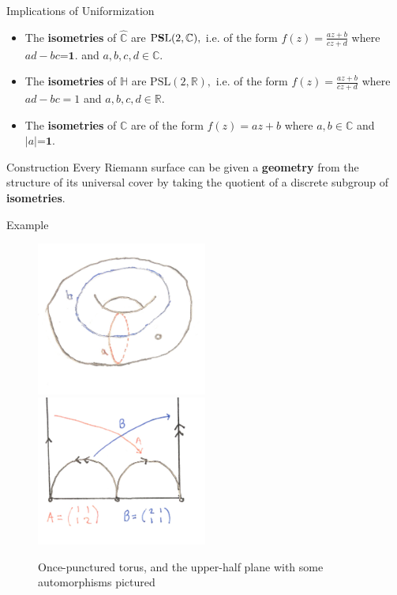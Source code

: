 \documentclass{beamer}
\begin{document}
\begin{frame}{Implications of Uniformization}

\begin{theorem}
\begin{itemize}
    \item The \textbf{isometries} of $\hat{\mathbb{C}}$ are $\text{P\textbf{S}L}(2, \mathbb{C}),$ i.e. of the form $f(z)=\frac{az+b}{cz+d}$ where $ad-bc\textbf{=1}.$ and $a, b, c, d\in \mathbb{C}.$
    \item The \textbf{isometries} of $\mathbb{H}$ are $\text{PSL}(2, \mathbb{R}),$ i.e. of the form $f(z)=\frac{az+b}{cz+d}$ where $ad-bc=1$ and $a, b, c, d\in \mathbb{R}.$
    \item The \textbf{isometries} of $\mathbb{C}$ are of the form $f(z)=az+b$ where $a, b\in \mathbb{C}$ and $|a|\textbf{=1}.$
\end{itemize}
\end{theorem}
\begin{block}{Construction}
Every Riemann surface can be given a \textbf{geometry} from the structure of its universal cover by taking the quotient of a discrete subgroup of \textbf{isometries}.
\end{block}
\end{frame}

\begin{frame}{Example}
\begin{figure}
    \centering
    \includegraphics[width=0.5\textwidth]{images_talk/once-puncturedtorus.jpg}%
\includegraphics[width=0.5\textwidth]{images_talk/upper-half-planedecktransf.jpg}
    \caption{Once-punctured torus, and the upper-half plane with some automorphisms pictured}
    \label{fig:torusupperhalfplane}
\end{figure}
\end{frame}
\end{document}

